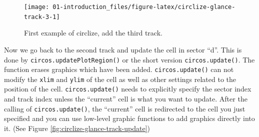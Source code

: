 \documentclass[]{book}
\newenvironment{Shaded}{\begin{snugshade}}{\end{snugshade}}
\newcommand{\KeywordTok}[1]{\textcolor[rgb]{0.13,0.29,0.53}{\textbf{#1}}}
\newcommand{\DataTypeTok}[1]{\textcolor[rgb]{0.13,0.29,0.53}{#1}}
\newcommand{\DecValTok}[1]{\textcolor[rgb]{0.00,0.00,0.81}{#1}}
\newcommand{\FloatTok}[1]{\textcolor[rgb]{0.00,0.00,0.81}{#1}}
\newcommand{\StringTok}[1]{\textcolor[rgb]{0.31,0.60,0.02}{#1}}
\newcommand{\ControlFlowTok}[1]{\textcolor[rgb]{0.13,0.29,0.53}{\textbf{#1}}}
\newcommand{\OperatorTok}[1]{\textcolor[rgb]{0.81,0.36,0.00}{\textbf{#1}}}
\newcommand{\NormalTok}[1]{#1}
\theoremstyle{definition}
\theoremstyle{definition}
\theoremstyle{remark}
\begin{document}
\begin{Shaded}
\end{Shaded}

\begin{figure}

{\centering \texttt{[image: 01-introduction\_files/figure-latex/circlize-glance-track-3-1]} 

}

\caption{First example of circlize, add the third track.}\label{fig:circlize-glance-track-3}
\end{figure}

Now we go back to the second track and update the cell in sector ``d''.
This is done by \texttt{circos.updatePlotRegion()} or the short version
\texttt{circos.update()}. The function erases graphics which have been
added. \texttt{circos.update()} can not modify the \texttt{xlim} and
\texttt{ylim} of the cell as well as other settings related to the
position of the cell. \texttt{circos.update()} needs to explicitly
specify the sector index and track index unless the ``current'' cell is
what you want to update. After the calling of \texttt{circos.update()},
the ``current'' cell is redirected to the cell you just specified and
you can use low-level graphic functions to add graphics directly into
it. (See Figure \ref{fig:circlize-glance-track-update})

\begin{Shaded}
\end{Shaded}
\end{document}
